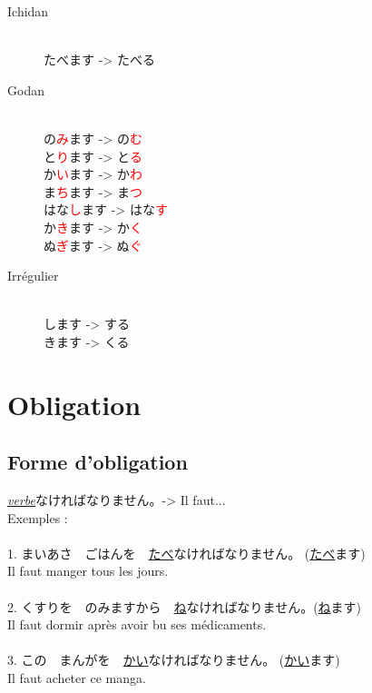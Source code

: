 \documentclass[11pt]{report}
\newenvironment{Japanese}{%
\CJKfamily{min}%
\CJKtilde  
\CJKnospace}{}
\begin{document}
\begin{CJK}{UTF8}{}  
\begin{Japanese}
	\begin{description}
		\item[Ichidan] \hfill \\
			たべます -> たべる
		\item[Godan] \hfill \\
			の\textcolor{red}{み}ます -> の\textcolor{red}{む} \\
			と\textcolor{red}{り}ます -> と\textcolor{red}{る} \\
			か\textcolor{red}{い}ます -> か\textcolor{red}{わ} \\
			ま\textcolor{red}{ち}ます -> ま\textcolor{red}{つ} \\
			はな\textcolor{red}{し}ます -> はな\textcolor{red}{す} \\
			か\textcolor{red}{き}ます -> か\textcolor{red}{く} \\
			ぬ\textcolor{red}{ぎ}ます -> ぬ\textcolor{red}{ぐ}
		\item[Irrégulier] \hfill \\
			します -> する \\
			きます -> くる
	\end{description}
\end{Japanese}  
\end{CJK}

\chapter{Obligation}

\section{Forme d'obligation}

\begin{CJK}{UTF8}{}  
\begin{Japanese}
	\underline{\emph{verbe}}なければなりません。-> Il faut... \\
	
	Exemples : \\ \\
	1. まいあさ　ごはんを　\underline{たべ}なければなりません。 (\underline{たべ}ます)\\
	Il faut manger tous les jours. \\ \\
	2. くすりを　のみますから　\underline{ね}なければなりません。(\underline{ね}ます) \\
	Il faut dormir après avoir bu ses médicaments. \\ \\
	3. この　まんがを　\underline{かい}なければなりません。 (\underline{かい}ます)\\
	Il faut acheter ce manga.
\end{Japanese}  
\end{CJK}
\end{document}
